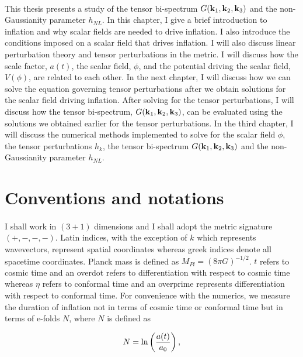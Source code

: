 \documentclass[12pt,a4paper,oneside]{book}
\begin{document}
\paragraph*{} This thesis presents a study of the tensor bi-spectrum $G({\bf k}_1, {\bf k}_2, {\bf k}_3)$ and the 
non-Gaussianity parameter $h_{NL}$. In this chapter, I give a brief introduction to 
inflation and why scalar fields are needed to drive inflation. I also introduce the 
conditions imposed on a scalar field that drives inflation. I will also discuss linear 
perturbation theory and tensor perturbations in the metric. I 
will discuss how the scale factor, $a(t)$, the scalar field, $\phi$, and the potential 
driving the scalar field, $V(\phi)$, are related to each other. In the next chapter, I will discuss 
how we can solve the equation governing tensor perturbations after we obtain 
solutions for the scalar field driving inflation. After solving for the tensor perturbations, 
I will discuss how the tensor bi-spectrum, $G({\bf k}_1, {\bf k}_2, {\bf k}_3)$, can be evaluated using the solutions 
we obtained earlier for the 
tensor perturbations. In the third chapter, I will discuss the numerical methods 
implemented to solve for the scalar field $\phi$, the tensor perturbations $h_k$, 
the tensor bi-spectrum $G({\bf k}_1, {\bf k}_2, {\bf k}_3)$ and the non-Gaussianity parameter $h_{NL}$.

\section{Conventions and notations}

\paragraph*{} I shall work in $(3+1)$ dimensions  and I shall adopt the metric 
signature $(+,-,-,-)$. Latin indices, with the exception of $k$ which represents 
wavevectors, represent spatial 
coordinates whereas greek indices denote all spacetime coordinates. Planck 
mass is defined as $M_{Pl} = (8\pi G)^{-1/2}$. 
$t$ refers to cosmic time and an overdot refers to differentiation 
with respect to cosmic time whereas $\eta$ refers to conformal time and an 
overprime represents differentiation with respect to conformal time. For convenience 
with the numerics, we measure the duration of inflation not in terms of cosmic time 
or conformal time but in terms of e-folds $N$, where $N$ is defined as

\begin{equation}
N = {\rm ln}\left(\frac{a(t)}{a_0}\right),
\end{equation}
\end{document}
